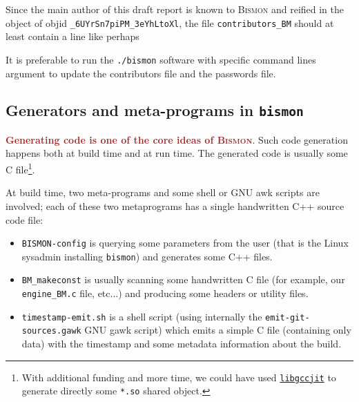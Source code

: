 \begin{appendices}
\begin{itemize}
\end{itemize}

Since the main author of this draft report is known to \textsc{Bismon}
and reified in the object of objid \texttt{\_6UYrSn7piPM\_3eYhLtoXl},
the file \texttt{contributors\_BM} should at least contain a line like
perhaps\\ {\parbox{8cm}{{}}}

It is preferable to run the \texttt{./bismon} software with specific
command lines argument to update the contributors file and the
passwords file.

\subsection{Generators and meta-programs in \texttt{bismon}}

\textcolor{brown}{\textbf{Generating code is one of the core ideas of \textsc{Bismon}}}. Such code
generation happens both at build time and at run time. The generated
code is usually some C file\footnote{With additional funding and more
time, we could have used
\href{https://gcc.gnu.org/onlinedocs/jit/}{\texttt{libgccjit}} to
generate directly some \texttt{*.so} shared object.}.

At build time, two meta-programs and some shell or GNU awk scripts are involved; each of these two metaprograms has a
single handwritten C++ source code file:

\begin{itemize}
  \item \texttt{BISMON-config}
     is
    querying some parameters from the user (that is the Linux sysadmin
    installing \texttt{bismon}) and generates some C++ files.

  \item \texttt{BM\_makeconst}
     is usually
    scanning some handwritten C file (for example, our
    \texttt{engine\_BM.c} file, etc...)  and producing some headers or
    utility files.

  \item \texttt{timestamp-emit.sh} is a shell script
    (using internally the \texttt{emit-git-sources.gawk} GNU gawk
    script)
     which emits a simple C file
    (containing only data) with the timestamp and some metadata
    information about the build.
    

\end{itemize}
\end{appendices}

